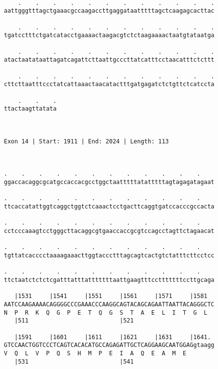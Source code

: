 \documentclass{article}
\begin{document}
\begin{Verbatim}
  
    .    .    .    .    .    .    .    .    .    .    .    .
aattgggtttagctgaaacgccaagaccttgaggataatttttagctcaagagcacttac
                                                            
    .    .    .    .    .    .    .    .    .    .    .    .
tgatcctttctgatcatacctgaaaactaagacgtctctaagaaaactaatgtataatga
                                                            
    .    .    .    .    .    .    .    .    .    .    .    .
atactaatataattagatcagattcttaattgcccttatcatttcctaacatttctcttt
                                                            
    .    .    .    .    .    .    .    .    .    .    .    .
cttcttaatttccctatcattaaactaacatactttgatgagatctctgttctcatccta
                                                            
    .    .    .
ttactaagttatata
               
               
 
Exon 14 | Start: 1911 | End: 2024 | Length: 113



.    .    .    .    .    .    .    .    .    .    .    .    
ggaccacaggcgcatgccaccacgcctggctaatttttatatttttagtagagatagaat
                                                            
.    .    .    .    .    .    .    .    .    .    .    .    
ttcaccatattggtcaggctggtctcaaactcctgacttcaggtgatccacccgccacta
                                                            
.    .    .    .    .    .    .    .    .    .    .    .    
cctcccaaagtcctgggcttacaggcgtgaaccaccgcgtccagcctagttctagaacat
                                                            
.    .    .    .    .    .    .    .    .    .    .    .    
tgttatcacccctaaaagaaacttggtaccctttagcagtcactgtctatttcttcctcc
                                                            
.    .    .    .    .    .    .    .    .    .    .    .    
ttctaatctctctcgatttatttatttttttaattgaagtttcctttttttccttgcaga
                                                            
   |1531     |1541     |1551     |1561     |1571     |1581  
AATCCAAGAAAACAGGGGCCCGAAACCCAAGGCAGTACAGCAGAATTAATTACAGGGCTC
N  P  R  K  Q  G  P  E  T  Q  G  S  T  A  E  L  I  T  G  L  
   |511                          |521                       
  
   |1591     |1601     |1611     |1621     |1631     |1641. 
GTCCAACTGGTCCCTCAGTCACACATGCCAGAGATTGCTCAGGAAGCAATGGAGgtaagg
V  Q  L  V  P  Q  S  H  M  P  E  I  A  Q  E  A  M  E        
   |531                          |541                       
  

\end{Verbatim}
\end{document}
